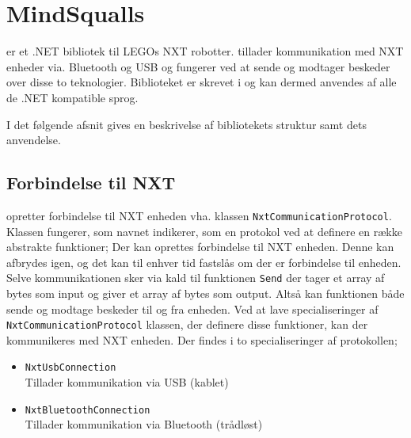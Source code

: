 \section{MindSqualls}
\mindsqualls er et .NET bibliotek til LEGOs NXT robotter.
\mindsqualls tillader kommunikation med NXT enheder via. Bluetooth og USB og fungerer ved at sende og modtager beskeder over disse to teknologier.
Biblioteket er skrevet i \csharp og kan dermed anvendes af alle de .NET kompatible sprog.

I det følgende afsnit gives en beskrivelse af bibliotekets struktur samt dets anvendelse.

\subsection{Forbindelse til NXT}
\mindsqualls opretter forbindelse til NXT enheden vha. klassen \lstinline[style=csharp]!NxtCommunicationProtocol!.
Klassen fungerer, som navnet indikerer, som en protokol ved at definere en række abstrakte funktioner;
Der kan oprettes forbindelse til NXT enheden.
Denne kan afbrydes igen, og det kan til enhver tid fastslås om der er forbindelse til enheden.
Selve kommunikationen sker via kald til funktionen \lstinline[style=csharp]!Send! der tager et array af bytes som input og giver et array af bytes som output.
Altså kan funktionen både sende og modtage beskeder til og fra enheden.
Ved at lave specialiseringer af \lstinline[style=csharp]!NxtCommunicationProtocol! klassen, der definere disse funktioner, kan der kommunikeres med NXT enheden.
Der findes i \mindsqualls to specialiseringer af protokollen;
\begin{itemize}
\item \lstinline[style=csharp]!NxtUsbConnection!\\
Tillader kommunikation via USB (kablet)
\item \lstinline[style=csharp]!NxtBluetoothConnection!\\
Tillader kommunikation via Bluetooth (trådløst)
\end{itemize}

